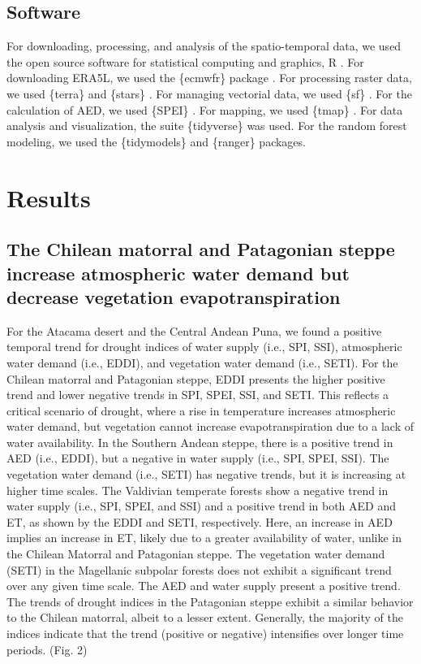 \documentclass[
  sn-nature,
  numbered]{sn-jnl}
\begin{document}
\subsection{Software}\label{software}

For downloading, processing, and analysis of the spatio-temporal data,
we used the open source software for statistical computing and graphics,
R \citep{R2023}. For downloading ERA5L, we used the \{ecmwfr\} package
\citep{Hufkens2019}. For processing raster data, we used \{terra\}
\citep{Hijmans2023} and \{stars\} \citep{Pebesma2023}. For managing
vectorial data, we used \{sf\} \citep{Pebesma2018}. For the calculation
of AED, we used \{SPEI\} \citep{Bergueria2023}. For mapping, we used
\{tmap\} \citep{Tennekes2018}. For data analysis and visualization, the
suite \{tidyverse\} \citep{Wickham2019} was used. For the random forest
modeling, we used the \{tidymodels\} \citep{Kuhn2020} and \{ranger\}
\citep{Wright2017} packages.

\section{Results}\label{results}

\subsection{The Chilean matorral and Patagonian steppe increase
atmospheric water demand but decrease vegetation
evapotranspiration}\label{the-chilean-matorral-and-patagonian-steppe-increase-atmospheric-water-demand-but-decrease-vegetation-evapotranspiration}

For the Atacama desert and the Central Andean Puna, we found a positive
temporal trend for drought indices of water supply (i.e., SPI, SSI),
atmospheric water demand (i.e., EDDI), and vegetation water demand
(i.e., SETI). For the Chilean matorral and Patagonian steppe, EDDI
presents the higher positive trend and lower negative trends in SPI,
SPEI, SSI, and SETI. This reflects a critical scenario of drought, where
a rise in temperature increases atmospheric water demand, but vegetation
cannot increase evapotranspiration due to a lack of water availability.
In the Southern Andean steppe, there is a positive trend in AED (i.e.,
EDDI), but a negative in water supply (i.e., SPI, SPEI, SSI). The
vegetation water demand (i.e., SETI) has negative trends, but it is
increasing at higher time scales. The Valdivian temperate forests show a
negative trend in water supply (i.e., SPI, SPEI, and SSI) and a positive
trend in both AED and ET, as shown by the EDDI and SETI, respectively.
Here, an increase in AED implies an increase in ET, likely due to a
greater availability of water, unlike in the Chilean Matorral and
Patagonian steppe. The vegetation water demand (SETI) in the Magellanic
subpolar forests does not exhibit a significant trend over any given
time scale. The AED and water supply present a positive trend. The
trends of drought indices in the Patagonian steppe exhibit a similar
behavior to the Chilean matorral, albeit to a lesser extent. Generally,
the majority of the indices indicate that the trend (positive or
negative) intensifies over longer time periods. (Fig. 2)
\end{document}
